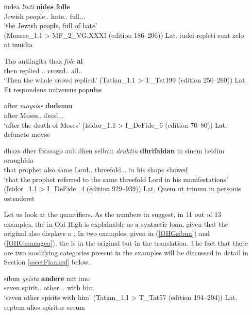 \documentclass[output=paper,colorlinks,citecolor=brown,draft]{langscibook}
\begin{document}
\ea\label{OHGfolle}
\gll iudea \textit{liuti} \textbf{nides} \textbf{folle}\\
Jewish people.\NOM.\PL{} hate.\GEN.\SG{} full.\NOM.\PL.\STR{}\\
\glt ‘the Jewish people, full of hate’ \\
(Monsee\_1.1 > MF\_2\_VG.XXXI (edition 186--206))
\glt Lat. iudei repleti sunt zelo at inuidia 	
\z
						
\ea\label{OHGal}
\gll Tho antlingita thaz \textit{folc} \textbf{al}\\
	then replied \DEF.\NOM.\SG{} crowd.\NOM.\SG{} all.\NOM.\SG{}\\
\glt ‘Then the whole crowd replied.’ (Tatian\_1.1 > T\_Tat199 (edition 250--260))
\glt Lat. Et respondens universus populus	
\z
							
\ea\label{OHGdodemu}
\gll after \textit{moysise} \textbf{dodemu}\\
after Moses.\DAT.\SG{} dead.\DAT.\SG.\STR{}\\
\glt ‘after the death of Moses’ (Isidor\_1.1 > I\_DeFide\_6 (edition 70--80))
\glt Lat. defuncto moyse
\z
							
\ea\label{OHGdhrifaldan}
\gll dhazs dher forasago auh dhen selbun \textit{druhtin} \textbf{dhrifaldan} in sinem heidim araughida\\
that \DEF{} prophet also \DEF{} same Lord.\ACC.\SG{} threefold.\ACC.\SG.\STR{} in his shape showed\\
\glt ‘that the prophet referred to the same threefold Lord in his manifestations’ (Isidor\_1.1 > I\_DeFide\_4 (edition 929--939))
\glt Lat. Quem ut trinum in personis ostenderet
\z

Let us look at the quantifiers. As the numbers in  suggest, in 11 out of 13 examples, the   in Old High  is explainable as a syntactic loan, given that the  original also displays a  . In two examples, given in (\ref{OHGsibun}) and (\ref{OHGmanagen}), the  is  in the  original but  in the translation. The fact that there are two modifying categories present in the examples will be discussed in detail in Section \ref{ssectFlanked} below.

\ea\label{OHGsibun}
\gll sibun \textit{geista} \textbf{andere} mit imo\\
seven spirit.\ACC.\PL{} other.\ACC.\PL.\STR{} with him\\
\glt ‘seven other spirits with him’ (Tatian\_1.1 > T\_Tat57 (edition 194--204))
\glt Lat. septem alios spiritus secum
\z						
\end{document}
